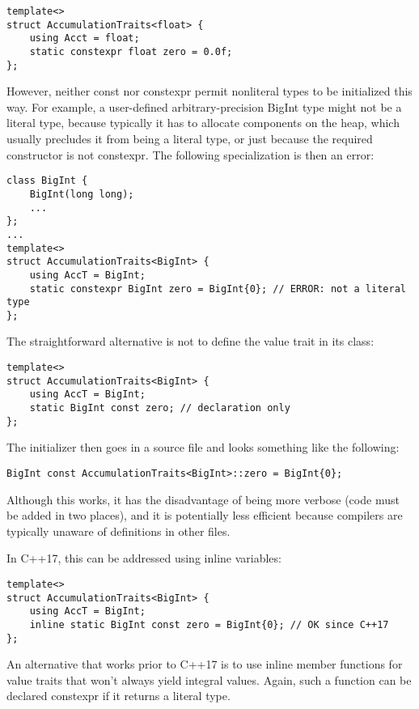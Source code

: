 \begin{lstlisting}[style=styleCXX]
template<>
struct AccumulationTraits<float> {
	using Acct = float;
	static constexpr float zero = 0.0f;
};
\end{lstlisting}

However, neither const nor constexpr permit nonliteral types to be initialized this way. For example, a user-defined arbitrary-precision BigInt type might not be a literal type, because typically it has to allocate components on the heap, which usually precludes it from being a literal type, or just because the required constructor is not constexpr. The following specialization is then an error:

\begin{lstlisting}[style=styleCXX]
class BigInt {
	BigInt(long long);
	...
};
...
template<>
struct AccumulationTraits<BigInt> {
	using AccT = BigInt;
	static constexpr BigInt zero = BigInt{0}; // ERROR: not a literal type
};
\end{lstlisting}

The straightforward alternative is not to define the value trait in its class:

\begin{lstlisting}[style=styleCXX]
template<>
struct AccumulationTraits<BigInt> {
	using AccT = BigInt;
	static BigInt const zero; // declaration only
};
\end{lstlisting}

The initializer then goes in a source file and looks something like the following:

\begin{lstlisting}[style=styleCXX]
BigInt const AccumulationTraits<BigInt>::zero = BigInt{0};
\end{lstlisting}

Although this works, it has the disadvantage of being more verbose (code must be added in two places), and it is potentially less efficient because compilers are typically unaware of definitions in other files.

In C++17, this can be addressed using inline variables:

\begin{lstlisting}[style=styleCXX]
template<>
struct AccumulationTraits<BigInt> {
	using AccT = BigInt;
	inline static BigInt const zero = BigInt{0}; // OK since C++17
};
\end{lstlisting}

An alternative that works prior to C++17 is to use inline member functions for value traits that won’t always yield integral values. Again, such a function can be declared constexpr if it returns a literal type.

